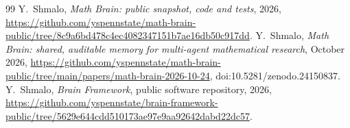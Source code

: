 \documentclass[11pt]{amsart}
\theoremstyle{remark}
\numberwithin{equation}{section}
\begin{document}
\begin{thebibliography}{99}
 Y.~Shmalo, \emph{Math Brain: public snapshot, code and tests}, 2026, \url{https://github.com/yspennstate/math-brain-public/tree/8c9a6bd478c4ec4082347151b7ae16db50c917dd}.
 Y.~Shmalo, \emph{Math Brain: shared, auditable memory for multi-agent mathematical research}, October 2026, \url{https://github.com/yspennstate/math-brain-public/tree/main/papers/math-brain-2026-10-24}, doi:10.5281/zenodo.24150837.
 Y.~Shmalo, \emph{Brain Framework}, public software repository, 2026, \url{https://github.com/yspennstate/brain-framework-public/tree/5629e644cdd510173ae97e9aa92642dabd22dc57}.
\end{thebibliography}
\end{document}
